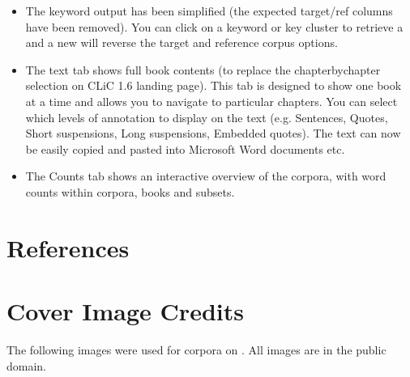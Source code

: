 \documentclass[letterpaper,10pt,english]{sphinxmanual}
\begin{document}
\begin{itemize}
\sphinxAtStartPar
In previous versions of CLiC there were minor discrepancies between
concordance and cluster counts. In CLiC 2.0, these have been resolved.

\item {} 
\sphinxAtStartPar
{}

\sphinxAtStartPar
The keyword output has been simplified (the expected target/ref columns
have been removed). You can click on a keyword or key cluster to
retrieve a  and a new 
will reverse the target and reference corpus options.

\item {} 
\sphinxAtStartPar
{}

\sphinxAtStartPar
The text tab shows full book contents (to replace the
chapter\sphinxhyphen{}by\sphinxhyphen{}chapter selection on CLiC 1.6 landing page). This tab is
designed to show one book at a time and allows you to navigate to
particular chapters. You can select which levels of annotation to
display on the text (e.g. Sentences, Quotes, Short suspensions, Long
suspensions, Embedded quotes). The text can now be easily copied and
pasted into Microsoft Word documents etc.

\item {} 
\sphinxAtStartPar
{}

\sphinxAtStartPar
The Counts tab shows an interactive overview of the corpora, with word
counts within corpora, books and subsets.

\end{itemize}

\sphinxstepscope


\chapter{References}
\label{\detokenize{references:references}}\label{\detokenize{references:id1}}\label{\detokenize{references::doc}}
\sphinxstepscope


\chapter{Cover Image Credits}
\label{\detokenize{image_sources:cover-image-credits}}\label{\detokenize{image_sources::doc}}
\sphinxAtStartPar
The following images were used for corpora on . All images are in the public domain.
\end{document}
